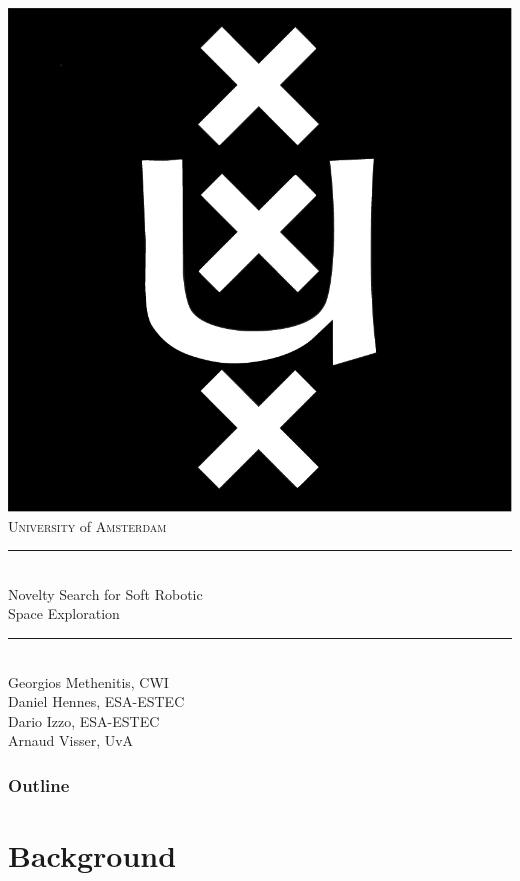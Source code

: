 \documentclass[6pt]{beamer}
\begin{document}
{\begin{frame}[plain]
\vspace{1cm}
\begin{center}
\includegraphics[height=.07\textwidth]{../Figures/Misc/University_of_Amsterdam_logo.pdf}\\
\textsc{University} of \textsc{Amsterdam}\\ \vspace{0.2cm}
\rule{\textwidth}{1pt}\\
{\Large Novelty Search for Soft Robotic\\ Space Exploration}\\[0.2cm] %
\rule{\textwidth}{0.5pt}\\ \vspace{0.4cm}
Georgios Methenitis, CWI\\
Daniel Hennes,  ESA-ESTEC\\
Dario Izzo, ESA-ESTEC\\
Arnaud Visser, UvA
\end{center}
\end{frame}
}



\begin{frame}
\frametitle{Outline}
\tableofcontents
\end{frame}





\section{Background}
\end{document}

